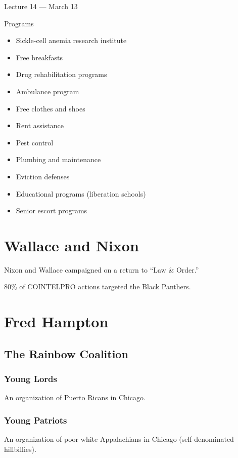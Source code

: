 \vspace{3mm}
\noindent Lecture 14 --- March 13\th

Programs

\begin{itemize}
    \item Sickle-cell anemia research institute
    \item Free breakfasts
    \item Drug rehabilitation programs
    \item Ambulance program
    \item Free clothes and shoes
    \item Rent assistance
    \item Pest control
    \item Plumbing and maintenance
    \item Eviction defenses
    \item Educational programs (liberation schools)
    \item Senior escort programs
\end{itemize}

\section{Wallace and Nixon}
Nixon and Wallace campaigned on a return to ``Law \& Order.''

80\% of COINTELPRO actions targeted the Black Panthers.

\section{Fred Hampton}

\subsection{The Rainbow Coalition}

\subsubsection{Young Lords}
An organization of Puerto Ricans in Chicago.


\subsubsection{Young Patriots}
An organization of poor white Appalachians in Chicago (self-denominated hillbillies).






